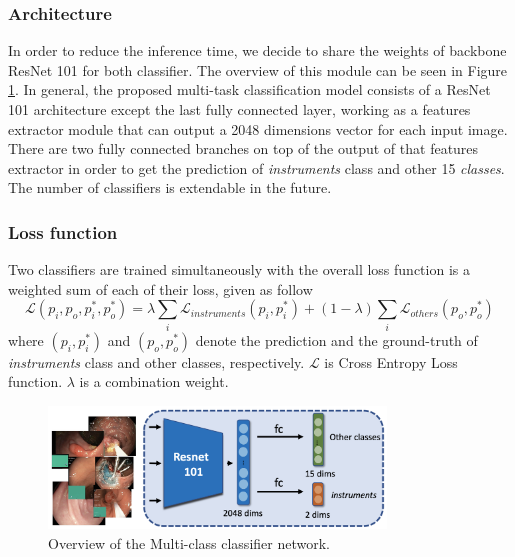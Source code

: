 \subsubsection*{Architecture}
In order to reduce the inference time, we decide to share the weights of backbone ResNet 101 for both classifier. The overview of this module can be seen in Figure \ref{fig:multitask_overview}. In general, the proposed multi-task classification model consists of a ResNet 101 architecture except the last fully connected layer, working as a features extractor module that can output a 2048 dimensions vector for  each input image. There are two fully connected branches on top of the output of that features extractor in order to get the prediction of \textit{instruments} class and other 15 \textit{classes}. The number of classifiers is extendable in the future.

\subsubsection*{Loss function}
Two classifiers are trained simultaneously with the overall loss function is a weighted sum of each of their loss, given as follow 
\begin{equation}
       \mathcal{L}(p_i, p_o,p_i^{*},p_o^{*}) = \lambda\sum_{i} \mathcal{L}_{instruments}(p_i, p_i^{*}) + (1-\lambda)\sum_{i}\mathcal{L}_{others}(p_o, p_o^{*})
\end{equation}
where $(p_i,p_i^{*})$ and $(p_o,p_o^{*})$ denote the prediction and the ground-truth of \textit{instruments} class and other classes, respectively. $\mathcal{L}$ is Cross Entropy Loss function. $\lambda$ is a combination weight.

\begin{figure}[H]

\begin{center}
\includegraphics[width=0.8\textwidth]{endoscopy_resources/multi-task.png}
\end{center}
   \caption{Overview of the Multi-class classifier network.}
\label{fig:multitask_overview}
\end{figure}

